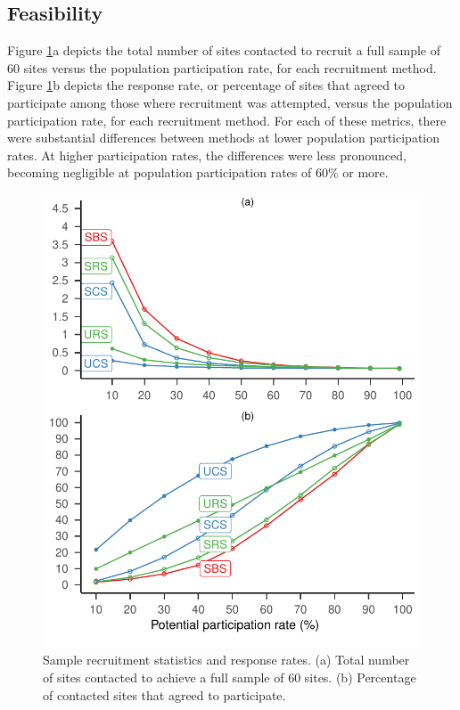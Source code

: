 \documentclass[
  man,floatsintext]{apa6}
\begin{document}
\hypertarget{feasibility-1}{%
\subsection*{Feasibility}\label{feasibility-1}}

Figure \ref{fig:fig-responses}a depicts the total number of sites contacted to recruit a full sample of 60 sites versus the population participation rate, for each recruitment method. Figure \ref{fig:fig-responses}b depicts the response rate, or percentage of sites that agreed to participate among those where recruitment was attempted, versus the population participation rate, for each recruitment method. For each of these metrics, there were substantial differences between methods at lower population participation rates. At higher participation rates, the differences were less pronounced, becoming negligible at population participation rates of 60\% or more.



\begin{figure}[tb]
\includegraphics[width=0.6\linewidth]{6---Paper_files/figure-latex/fig-responses-1} \caption{Sample recruitment statistics and response rates. (a) Total number of sites contacted to achieve a full sample of 60 sites. (b) Percentage of contacted sites that agreed to participate.}\label{fig:fig-responses}
\end{figure}
\end{document}
